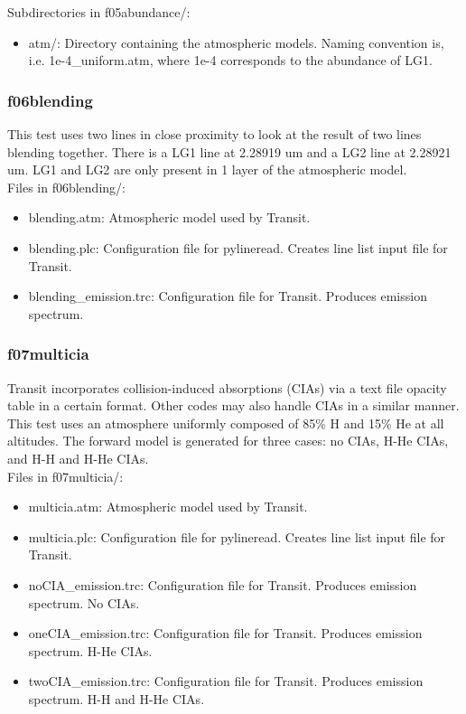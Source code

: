 \documentclass[letterpaper, 12pt]{article}
\begin{document}
Subdirectories in f05abundance/:
\begin{itemize} \itemsep0pt
  \item atm/: Directory containing the atmospheric models. Naming convention 
        is, i.e. 1e-4{\_}uniform.atm, where 1e-4 corresponds to the abundance 
of LG1.
\end{itemize}

\subsubsection{f06blending}
\label{sec:blending}
This test uses two lines in close proximity to look at the 
result of two lines blending together. There is a LG1 line at 2.28919 um 
and a LG2 line at 2.28921 um. LG1 and LG2 are only present in 1 layer of 
the atmospheric model.\\

Files in f06blending/:
\begin{itemize} \itemsep0pt
  \item blending.atm: Atmospheric model used by Transit.
  \item blending.plc: Configuration file for pylineread. Creates 
        line list input file for Transit.
  \item blending{\_}emission.trc: Configuration file for Transit. Produces 
        emission spectrum.
\end{itemize}

\subsubsection{f07multicia}
\label{sec:multicia}
Transit incorporates collision-induced absorptions (CIAs) via a text file 
opacity table in a certain format. Other codes may also handle CIAs in a 
similar manner. This test uses an atmosphere uniformly composed of 85\% H 
and 15\% He at all altitudes. The forward model is generated for three cases: 
no CIAs, H-He CIAs, and H-H and H-He CIAs.\\

Files in f07multicia/:
\begin{itemize} \itemsep0pt
  \item multicia.atm: Atmospheric model used by Transit.
  \item multicia.plc: Configuration file for pylineread. Creates 
        line list input file for Transit.
  \item noCIA{\_}emission.trc: Configuration file for Transit. Produces 
        emission spectrum. No CIAs.
  \item oneCIA{\_}emission.trc: Configuration file for Transit. Produces 
        emission spectrum. H-He CIAs.
  \item twoCIA{\_}emission.trc: Configuration file for Transit. Produces 
        emission spectrum. H-H and H-He CIAs.
\end{itemize}
\end{document}
